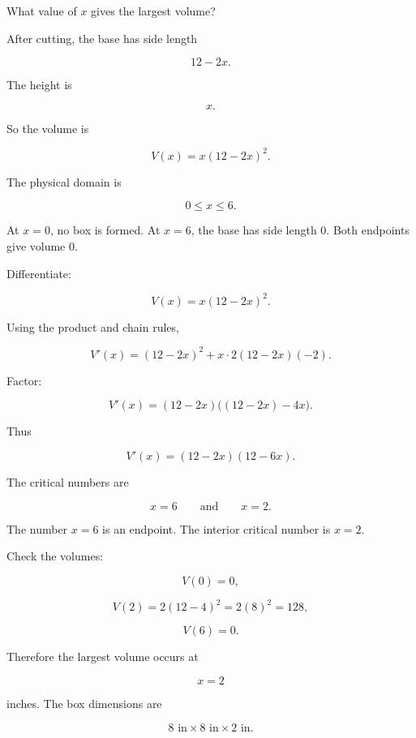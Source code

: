 What value of \(x\) gives the largest volume?

After cutting, the base has side length

\[
12-2x.
\]

The height is

\[
x.
\]

So the volume is

\[
V(x)=x(12-2x)^2.
\]

The physical domain is

\[
0\le x\le 6.
\]

At \(x=0\), no box is formed.  At \(x=6\), the base has side length \(0\).  Both endpoints
give volume \(0\).

Differentiate:

\[
V(x)=x(12-2x)^2.
\]

Using the product and chain rules,

\[
V'(x)
=
(12-2x)^2+x\cdot 2(12-2x)(-2).
\]

Factor:

\[
V'(x)
=
(12-2x)\bigl((12-2x)-4x\bigr).
\]

Thus

\[
V'(x)
=
(12-2x)(12-6x).
\]

The critical numbers are

\[
x=6
\qquad\text{and}\qquad
x=2.
\]

The number \(x=6\) is an endpoint.  The interior critical number is \(x=2\).

Check the volumes:

\[
V(0)=0,
\]

\[
V(2)=2(12-4)^2=2(8)^2=128,
\]

\[
V(6)=0.
\]

Therefore the largest volume occurs at

\[
\boxed{x=2}
\]

inches.  The box dimensions are

\[
8\text{ in}\times 8\text{ in}\times 2\text{ in}.
\]

